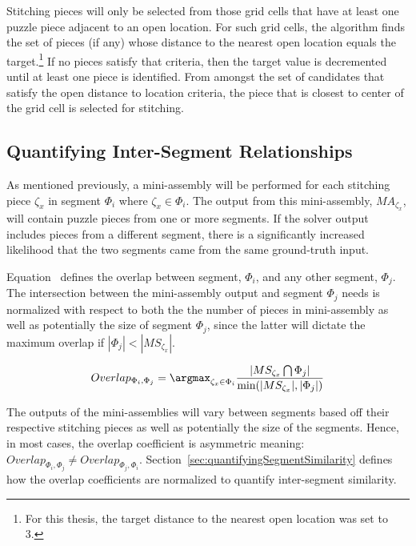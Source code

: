 Stitching pieces will only be selected from those grid cells that have at least one puzzle piece adjacent to an open location. For such grid cells, the algorithm finds the set of pieces (if any) whose distance to the nearest open location equals the target.\footnote{For this thesis, the target distance to the nearest open location was set to 3.}  If no pieces satisfy that criteria, then the target value is decremented until at least one piece is identified. From amongst the set of candidates that satisfy the open distance to location criteria, the piece that is closest to center of the grid cell is selected for stitching. 

\subsection{Quantifying Inter-Segment Relationships}

As mentioned previously, a mini-assembly will be performed for each stitching piece $\zeta_x$ in segment $\Phi_i$ where $\zeta_x \in \Phi_i$.  The output from this mini-assembly, $MA_{\zeta_x}$, will contain puzzle pieces from one or more segments.  If the solver output includes pieces from a different segment, there is a significantly increased likelihood that the two segments came from the same ground-truth input. 

Equation~ defines the overlap between segment, $\Phi_i$, and any other segment, $\Phi_j$. The intersection between the mini-assembly output and segment $\Phi_j$ needs is normalized with respect to both the the number of pieces in mini-assembly as well as potentially the size of segment $\Phi_j$, since the latter will dictate the maximum overlap if $|\Phi_j| < |MS_{\zeta_x}|$.

\begin{equation} \label{eq:segmentOverlap}
Overlap_{\Phi_i,\Phi_j} = \argmax_{\zeta_x \in \Phi_i} {\frac{|MS_{\zeta_x} \bigcap \Phi_j|}{\text{min}(|MS_{\zeta_x}|, |\Phi_j|)}}
\end{equation}

The outputs of the mini-assemblies will vary between segments based off their respective stitching pieces as well as potentially the size of the segments.  Hence, in most cases, the overlap coefficient is asymmetric meaning: $Overlap_{\Phi_i,\Phi_j} \neq Overlap_{\Phi_j,\Phi_i}$.  Section~\ref{sec:quantifyingSegmentSimilarity} defines how the overlap coefficients are normalized to quantify inter-segment similarity.

